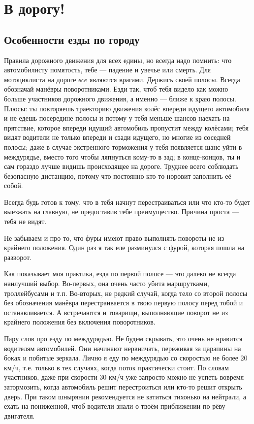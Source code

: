 \documentclass[12pt,a4paper]{article}
\begin{document}
\section{В дорогу!}

\subsection{Особенности езды по городу}

Правила дорожного движения для всех едины, но всегда надо помнить:
что автомобилисту помятость, тебе --- падение и увечье или смерть.
Для мотоциклиста на дороге \emph{все} являются врагами.
Держись своей полосы. Всегда обозначай манёвры поворотниками.
Езди так, чтоб тебя видело как можно больше участников дорожного
движения, а именно --- ближе к краю полосы. Плюсы: ты повторяешь
траекторию движения колёс впереди идущего автомобиля и не едешь
посередине полосы и потому у тебя меньше шансов наехать на прятствие,
которое впереди идущий автомобиль пропустит между колёсами; тебя
видят водители не только впереди и сзади идущего, но многие из
соседней полосы; даже в случае экстренного торможения у тебя
появляется шанс уйти в междурядье, вместо того чтобы ляпнуться
кому-то в зад; в конце-концов, ты и сам гораздо лучше видишь
происходящее на дороге.
Труднее всего соблюдать безопасную дистанцию, потому что постоянно
кто-то норовит заполнить её собой.

Всегда будь готов к тому, что в тебя начнут перестраиваться или
что кто-то будет выезжать на главную, не предоставив тебе
преимущество. Причина проста --- тебя не видят.

Не забываем и про то, что фуры имеют право
выполнять повороты не из крайнего положения. Один раз я так еле
разминулся с фурой, которая пошла на разворот.

Как показывает моя практика, езда по первой полосе --- это далеко
не всегда наилучший выбор. Во-первых, она очень часто убита маршрутками,
троллейбусами и т.п. Во-вторых, не редкий случай, когда тело со второй
полосы без обозначения манёвра перестраивается в твою первую полосу
перед тобой и останавливается. А встречаются и товарищи, выполняющие
поворот не из крайнего положения без включения поворотников.

Пару слов про езду по междурядью. Не будем скрывать, это очень не
нравится водителям автомобилей. Они начинают нервничать, переживая
за царапины на боках и побитые зеркала. Лично я еду по междурядью со
скоростью не более 20 км/ч, т.е. только в тех случаях, когда поток
практически стоит. По словам участников, даже при скорости 30 км/ч
уже запросто можно не успеть вовремя затормозить, когда автомобиль
решит перестроиться или кто-то решит открыть дверь. При таком
шнырянии рекомендуется не катиться тихонько на нейтрали, а ехать
на пониженной, чтоб водители знали о твоём приближении по рёву
двигателя.
\end{document}
